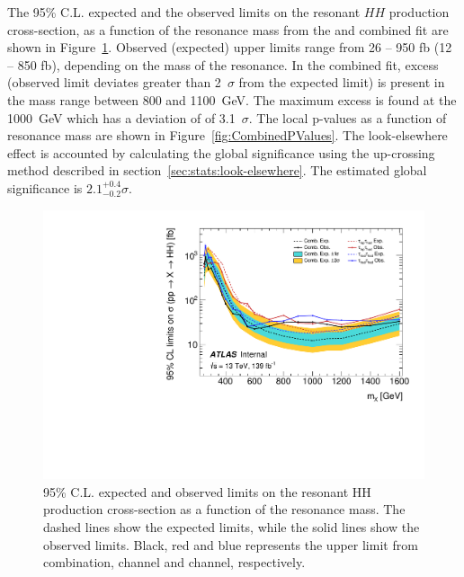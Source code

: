 The 95\% C.L. expected and the observed limits on the 
resonant $HH$ production cross-section, as a function of the resonance mass from the 
\lephad and \hadhad combined fit are shown in Figure~\ref{fig:CombinedLimits}.
Observed (expected) upper limits range from 26 -- 950 fb (12 -- 850 fb), 
depending on the mass of the resonance.
In the combined fit, excess (observed limit deviates greater than 2~$\sigma$ from the expected limit)
is present in the mass range between 800 and 1100~GeV. 
The maximum excess is found at the 1000~GeV which has a deviation of
of 3.1~$\sigma$. 
The local p-values as a function of resonance mass are shown in Figure~\ref{fig:CombinedPValues}.
The look-elsewhere effect is accounted by calculating the global significance
using the up-crossing method described in section~\ref{sec:stats:look-elsewhere}.
The estimated global significance is $2.1^{+0.4}_{-0.2} \sigma$.


\begin{figure}[htbp]
\centering
\includegraphics[width=.8\textwidth]{figures/results/HH/Combined/CombSysts_21072021.pdf}
\caption{95\% C.L. expected and observed limits on the resonant HH production cross-section as a function of the resonance mass. 
The dashed lines show the expected limits, while the solid lines show the observed limits. 
Black, red and blue represents the upper limit from combination, \lephad channel and \hadhad channel, respectively.}
\label{fig:CombinedLimits}
\end{figure}


